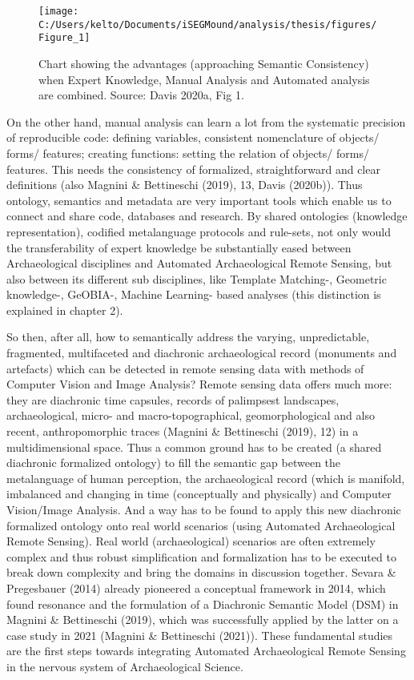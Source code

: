 \documentclass[
  12pt,
]{article}
\begin{document}
\begin{figure}

{\centering \texttt{[image: C:/Users/kelto/Documents/iSEGMound/analysis/thesis/figures/Figure\_1]} 

}

\caption{Chart showing the advantages (approaching Semantic Consistency) when Expert Knowledge, Manual Analysis and Automated analysis are combined. Source: Davis 2020a, Fig 1.}\label{fig:Figure1}
\end{figure}

On the other hand, manual analysis can learn a lot from the systematic precision of reproducible code: defining variables, consistent nomenclature of objects/ forms/ features; creating functions: setting the relation of objects/ forms/ features. This needs the consistency of formalized, straightforward and clear definitions (also Magnini \& Bettineschi (2019), 13, Davis (2020b)). Thus ontology, semantics and metadata are very important tools which enable us to connect and share code, databases and research. By shared ontologies (knowledge representation), codified metalanguage protocols and rule-sets, not only would the transferability of expert knowledge be substantially eased between Archaeological disciplines and Automated Archaeological Remote Sensing, but also between its different sub disciplines, like Template Matching-, Geometric knowledge-, GeOBIA-, Machine Learning- based analyses (this distinction is explained in chapter 2).

So then, after all, how to semantically address the varying, unpredictable, fragmented, multifaceted and diachronic archaeological record (monuments and artefacts) which can be detected in remote sensing data with methods of Computer Vision and Image Analysis? Remote sensing data offers much more: they are diachronic time capsules, records of palimpsest landscapes, archaeological, micro- and macro-topographical, geomorphological and also recent, anthropomorphic traces (Magnini \& Bettineschi (2019), 12) in a multidimensional space. Thus a common ground has to be created (a shared diachronic formalized ontology) to fill the semantic gap between the metalanguage of human perception, the archaeological record (which is manifold, imbalanced and changing in time (conceptually and physically) and Computer Vision/Image Analysis. And a way has to be found to apply this new diachronic formalized ontology onto real world scenarios (using Automated Archaeological Remote Sensing). Real world (archaeological) scenarios are often extremely complex and thus robust simplification and formalization has to be executed to break down complexity and bring the domains in discussion together. Sevara \& Pregesbauer (2014) already pioneered a conceptual framework in 2014, which found resonance and the formulation of a Diachronic Semantic Model (DSM) in Magnini \& Bettineschi (2019), which was successfully applied by the latter on a case study in 2021 (Magnini \& Bettineschi (2021)). These fundamental studies are the first steps towards integrating Automated Archaeological Remote Sensing in the nervous system of Archaeological Science.
\end{document}
